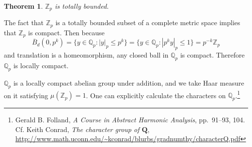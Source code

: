 \documentclass{article}
\theoremstyle{plain}
\newtheorem{theorem}{Theorem}
\theoremstyle{definition}
\begin{document}
\begin{theorem}
$\mathbb{Z}_p$ is totally bounded.
\end{theorem}

The fact that $\mathbb{Z}_p$ is a totally bounded subset of a complete metric space implies that $\mathbb{Z}_p$ is compact. Then because
\[
\overline{B}_d(0,p^k)=\{y \in \mathbb{Q}_p: |y|_p \leq p^k\} = \{y \in \mathbb{Q}_p: |p^k y|_p \leq 1\}
=p^{-k} \mathbb{Z}_p
\]
and translation is a homeomorphism, any closed ball in $\mathbb{Q}_p$ is compact. 
Therefore $\mathbb{Q}_p$ is locally compact. 

$\mathbb{Q}_p$ is a locally compact abelian group under addition, and we take Haar measure on it
satisfying $\mu(\mathbb{Z}_p)=1$. One can explicitly calculate the characters on $\mathbb{Q}_p$.\footnote{Gerald B. Folland, {\em A Course in Abstract Harmonic Analysis}, pp.~91--93, 104. Cf. Keith Conrad, {\em The character group of $\mathbf{Q}$}, \url{http://www.math.uconn.edu/~kconrad/blurbs/gradnumthy/characterQ.pdf}}
\end{document}
